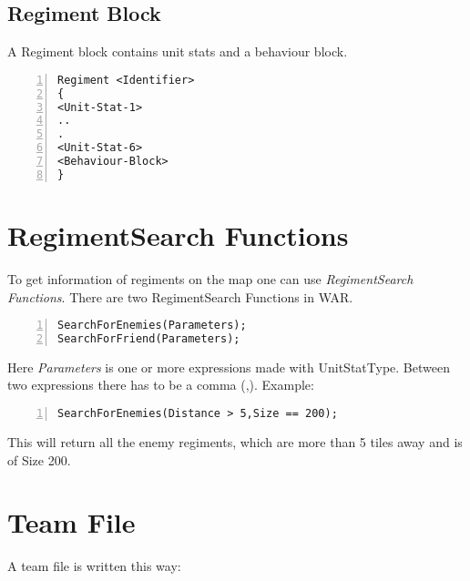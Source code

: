 	\subsection{Regiment Block}
		A Regiment block contains unit stats and a behaviour block.

		\begin{lstlisting}[basicstyle=\small\sffamily,
		keywordstyle={\color{blue}},
		comment={[l]{//}}, morecomment={[s]{/*}{*/}}, commentstyle=\itshape,
		columns={[l]flexible}, numbers=left, numberstyle=\tiny,
		frameround=fftt, frame=shadowbox, captionpos=b,
		caption={Regiment block}]
Regiment <Identifier>
{
<Unit-Stat-1>
..
.
<Unit-Stat-6>
<Behaviour-Block>
}
		\end{lstlisting}
\section{RegimentSearch Functions}
\label{sec:regimentSearch}
	To get information of regiments on the map one can use {\it RegimentSearch Functions}. There are two RegimentSearch Functions in WAR.\\

		\begin{lstlisting}[basicstyle=\small\sffamily,
		keywordstyle={\color{blue}},
		comment={[l]{//}}, morecomment={[s]{/*}{*/}}, commentstyle=\itshape,
		columns={[l]flexible}, numbers=left, numberstyle=\tiny,
		frameround=fftt, frame=shadowbox, captionpos=b,
		caption={RegimentSearch Functions}]
SearchForEnemies(Parameters);
SearchForFriend(Parameters);
	\end{lstlisting}
	Here {\it Parameters} is one or more expressions made with UnitStatType. Between two expressions there has to be a comma (,).
	Example: \\

		\begin{lstlisting}[basicstyle=\small\sffamily,
		keywordstyle={\color{blue}},
		comment={[l]{//}}, morecomment={[s]{/*}{*/}}, commentstyle=\itshape,
		columns={[l]flexible}, numbers=left, numberstyle=\tiny,
		frameround=fftt, frame=shadowbox, captionpos=b,
		caption={Functions with parameters}]
SearchForEnemies(Distance > 5,Size == 200);
	\end{lstlisting}
	This will return all the enemy regiments, which are more than 5 tiles away and is of Size 200.		
\section{Team File}
\label{doc:teamfile}
	A team file is written this way: \\

